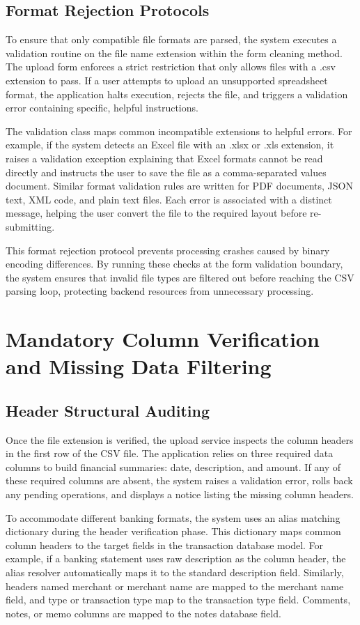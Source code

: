 \subsection{Format Rejection Protocols}
To ensure that only compatible file formats are parsed, the system executes a validation routine on the file name extension within the form cleaning method. The upload form enforces a strict restriction that only allows files with a .csv extension to pass. If a user attempts to upload an unsupported spreadsheet format, the application halts execution, rejects the file, and triggers a validation error containing specific, helpful instructions.

The validation class maps common incompatible extensions to helpful errors. For example, if the system detects an Excel file with an .xlsx or .xls extension, it raises a validation exception explaining that Excel formats cannot be read directly and instructs the user to save the file as a comma-separated values document. Similar format validation rules are written for PDF documents, JSON text, XML code, and plain text files. Each error is associated with a distinct message, helping the user convert the file to the required layout before re-submitting.

This format rejection protocol prevents processing crashes caused by binary encoding differences. By running these checks at the form validation boundary, the system ensures that invalid file types are filtered out before reaching the CSV parsing loop, protecting backend resources from unnecessary processing.

\section{Mandatory Column Verification and Missing Data Filtering}
\subsection{Header Structural Auditing}
Once the file extension is verified, the upload service inspects the column headers in the first row of the CSV file. The application relies on three required data columns to build financial summaries: date, description, and amount. If any of these required columns are absent, the system raises a validation error, rolls back any pending operations, and displays a notice listing the missing column headers.

To accommodate different banking formats, the system uses an alias matching dictionary during the header verification phase. This dictionary maps common column headers to the target fields in the transaction database model. For example, if a banking statement uses raw description as the column header, the alias resolver automatically maps it to the standard description field. Similarly, headers named merchant or merchant name are mapped to the merchant name field, and type or transaction type map to the transaction type field. Comments, notes, or memo columns are mapped to the notes database field.

